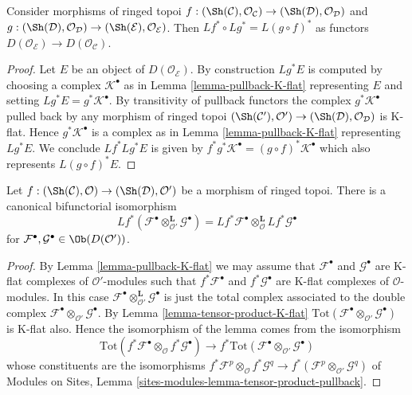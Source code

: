 \begin{lemma}
\label{lemma-derived-pullback-composition}
Consider morphisms of ringed topoi
$f : (\Sh(\mathcal{C}), \mathcal{O}_\mathcal{C}) \to
(\Sh(\mathcal{D}), \mathcal{O}_\mathcal{D})$
and
$g : (\Sh(\mathcal{D}), \mathcal{O}_\mathcal{D}) \to
(\Sh(\mathcal{E}), \mathcal{O}_\mathcal{E})$.
Then $Lf^* \circ Lg^* = L(g \circ f)^*$ as functors
$D(\mathcal{O}_\mathcal{E}) \to D(\mathcal{O}_\mathcal{C})$.
\end{lemma}

\begin{proof}
Let $E$ be an object of $D(\mathcal{O}_\mathcal{E})$.
By construction $Lg^*E$ is computed by choosing a complex
$\mathcal{K}^\bullet$ as in Lemma \ref{lemma-pullback-K-flat}
representing $E$ and setting $Lg^*E = g^*\mathcal{K}^\bullet$.
By transitivity of pullback functors the complex $g^*\mathcal{K}^\bullet$
pulled back by any morphism of ringed topoi
$(\Sh(\mathcal{C}'), \mathcal{O}') \to
(\Sh(\mathcal{D}), \mathcal{O}_\mathcal{D})$
is K-flat. Hence $g^*\mathcal{K}^\bullet$ is a complex as in
Lemma \ref{lemma-pullback-K-flat} representing $Lg^*E$.
We conclude $Lf^*Lg^*E$ is given by
$f^*g^*\mathcal{K}^\bullet = (g \circ f)^*\mathcal{K}^\bullet$
which also represents $L(g \circ f)^*E$.
\end{proof}

\begin{lemma}
\label{lemma-pullback-tensor-product}
Let $f : (\Sh(\mathcal{C}), \mathcal{O}) \to (\Sh(\mathcal{D}), \mathcal{O}')$
be a morphism of ringed topoi.
There is a canonical bifunctorial isomorphism
$$
Lf^*(
\mathcal{F}^\bullet \otimes_{\mathcal{O}'}^{\mathbf{L}} \mathcal{G}^\bullet
) =
Lf^*\mathcal{F}^\bullet 
\otimes_{\mathcal{O}}^{\mathbf{L}}
Lf^*\mathcal{G}^\bullet 
$$
for $\mathcal{F}^\bullet, \mathcal{G}^\bullet \in \Ob(D(\mathcal{O}'))$.
\end{lemma}

\begin{proof}
By Lemma \ref{lemma-pullback-K-flat} we may assume that $\mathcal{F}^\bullet$
and $\mathcal{G}^\bullet$ are K-flat complexes of $\mathcal{O}'$-modules
such that $f^*\mathcal{F}^\bullet$ and $f^*\mathcal{G}^\bullet$
are K-flat complexes of $\mathcal{O}$-modules. In this case
$\mathcal{F}^\bullet \otimes_{\mathcal{O}'}^{\mathbf{L}} \mathcal{G}^\bullet$
is just the total complex associated to the double complex
$\mathcal{F}^\bullet \otimes_{\mathcal{O}'} \mathcal{G}^\bullet$. By
Lemma \ref{lemma-tensor-product-K-flat}
$\text{Tot}(\mathcal{F}^\bullet \otimes_{\mathcal{O}'} \mathcal{G}^\bullet)$
is K-flat also. Hence the isomorphism of the lemma comes from the
isomorphism
$$
\text{Tot}(f^*\mathcal{F}^\bullet \otimes_{\mathcal{O}}
f^*\mathcal{G}^\bullet)
\longrightarrow
f^*\text{Tot}(\mathcal{F}^\bullet \otimes_{\mathcal{O}'} \mathcal{G}^\bullet)
$$
whose constituents are the isomorphisms
$f^*\mathcal{F}^p \otimes_{\mathcal{O}} f^*\mathcal{G}^q \to
f^*(\mathcal{F}^p \otimes_{\mathcal{O}'} \mathcal{G}^q)$ of
Modules on Sites, Lemma \ref{sites-modules-lemma-tensor-product-pullback}.
\end{proof}

